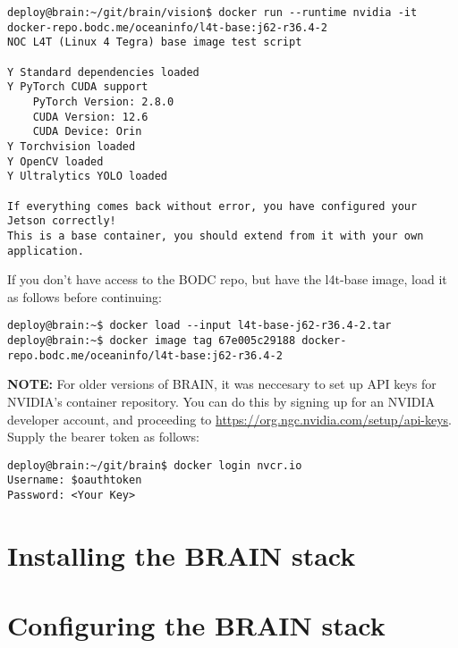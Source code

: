 \documentclass[11pt]{article}
\begin{document}

\lstset{style=console}
\begin{lstlisting}
deploy@brain:~/git/brain/vision$ docker run --runtime nvidia -it docker-repo.bodc.me/oceaninfo/l4t-base:j62-r36.4-2
NOC L4T (Linux 4 Tegra) base image test script

Y Standard dependencies loaded
Y PyTorch CUDA support
    PyTorch Version: 2.8.0
    CUDA Version: 12.6
    CUDA Device: Orin
Y Torchvision loaded
Y OpenCV loaded
Y Ultralytics YOLO loaded

If everything comes back without error, you have configured your Jetson correctly!
This is a base container, you should extend from it with your own application.
\end{lstlisting}

If you don't have access to the BODC repo, but have the l4t-base image, load it as follows before continuing:

\lstset{style=console}
\begin{lstlisting}
deploy@brain:~$ docker load --input l4t-base-j62-r36.4-2.tar
deploy@brain:~$ docker image tag 67e005c29188 docker-repo.bodc.me/oceaninfo/l4t-base:j62-r36.4-2
\end{lstlisting}

\textbf{NOTE:} For older versions of BRAIN, it was neccesary to set up API keys for NVIDIA's container repository. You can do this by signing up for an NVIDIA developer account, and proceeding to \href{https://org.ngc.nvidia.com/setup/api-keys}{https://org.ngc.nvidia.com/setup/api-keys}. Supply the bearer token as follows:

\lstset{style=console}
\begin{lstlisting}
deploy@brain:~/git/brain$ docker login nvcr.io
Username: $oauthtoken
Password: <Your Key>
\end{lstlisting}

\newpage

\section{Installing the BRAIN stack}

\newpage

\section{Configuring the BRAIN stack}

\newpage
\end{document}
